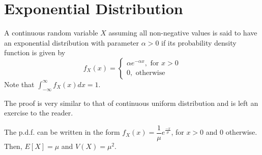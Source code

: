 \section{Exponential Distribution}
\begin{definition}
\end{definition}
A continuous random variable $X$ assuming all non-negative values is said to have an exponential distribution with parameter $\alpha > 0$ if its probability density function is given by
$$
f_X(x) = \begin{cases}
\alpha e^{-\alpha x}, \text{ for } x > 0 \\
0, \text{ otherwise}
\end{cases}
$$
Note that $\int_{-\infty}^{\infty} f_X(x)dx = 1$.

The proof is very similar to that of continuous uniform distribution and is left an exercise to the reader.

\begin{note}
\end{note}
The p.d.f. can be written in the form $f_X(x) = \dfrac{1}{\mu} e^{\frac{-x}{\mu}}$, for $x > 0$ and 0 otherwise. Then, $E[X] = \mu$ and $V(X) = \mu^2$.

